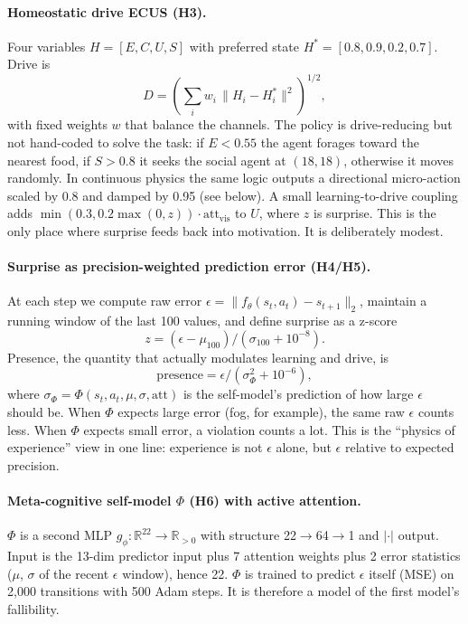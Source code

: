 \documentclass[11pt,a4paper]{article}
\begin{document}
\paragraph{Homeostatic drive ECUS (H3).} Four variables $H=[E, C, U, S]$ with preferred state $H^*=[0.8, 0.9, 0.2, 0.7]$. Drive is
\begin{equation}
D = \left(\sum_i w_i \, \|H_i - H^*_i\|^2 \right)^{1/2},
\end{equation}
with fixed weights $w$ that balance the channels. The policy is drive-reducing but not hand-coded to solve the task: if $E < 0.55$ the agent forages toward the nearest food, if $S > 0.8$ it seeks the social agent at $(18,18)$, otherwise it moves randomly. In continuous physics the same logic outputs a directional micro-action scaled by 0.8 and damped by 0.95 (see below). A small learning-to-drive coupling adds $\min(0.3, 0.2\max(0,z)) \cdot \mathrm{att}_{\mathrm{vis}}$ to $U$, where $z$ is surprise. This is the only place where surprise feeds back into motivation. It is deliberately modest.

\paragraph{Surprise as precision-weighted prediction error (H4/H5).} At each step we compute raw error $\epsilon = \|f_\theta(s_t,a_t) - s_{t+1}\|_2$, maintain a running window of the last 100 values, and define surprise as a z-score
\begin{equation}
z = (\epsilon - \mu_{100}) / (\sigma_{100}+10^{-8}).
\end{equation}
Presence, the quantity that actually modulates learning and drive, is
\begin{equation}
\mathrm{presence} = \epsilon / (\sigma_\Phi^2 + 10^{-6}),
\end{equation}
where $\sigma_\Phi = \Phi(s_t, a_t, \mu, \sigma, \mathrm{att})$ is the self-model's prediction of how large $\epsilon$ should be. When $\Phi$ expects large error (fog, for example), the same raw $\epsilon$ counts less. When $\Phi$ expects small error, a violation counts a lot. This is the ``physics of experience'' view in one line: experience is not $\epsilon$ alone, but $\epsilon$ relative to expected precision.

\paragraph{Meta-cognitive self-model $\Phi$ (H6) with active attention.} $\Phi$ is a second MLP $g_\phi: \mathbb{R}^{22} \rightarrow \mathbb{R}_{>0}$ with structure 22$\rightarrow$64$\rightarrow$1 and $|\cdot|$ output. Input is the 13-dim predictor input plus 7 attention weights plus 2 error statistics ($\mu$, $\sigma$ of the recent $\epsilon$ window), hence 22. $\Phi$ is trained to predict $\epsilon$ itself (MSE) on 2,000 transitions with 500 Adam steps. It is therefore a model of the first model's fallibility.
\end{document}
